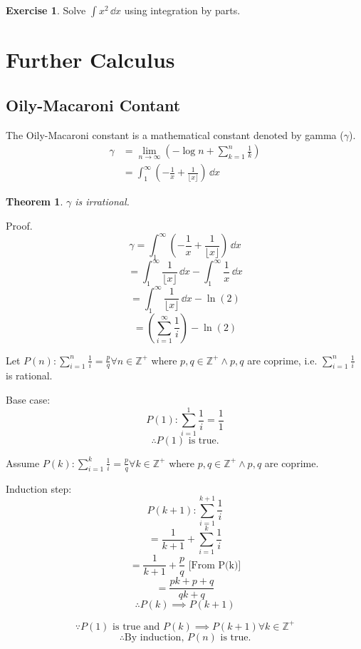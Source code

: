 \documentclass[a4paper]{article}
\theoremstyle{plain}
\newtheorem{theorem}{Theorem}[section]
\theoremstyle{definition}
\newtheorem{exercise}{Exercise}[section]
\theoremstyle{remark}
\newcommand{\sectionSpace}{\vspace{2em}} %
\newcommand{\subsectionSpace}{\vspace{0.5em}}
\begin{document}
    \begin{exercise}
        Solve $\int x^2\,\dd{x}$ using integration by parts.
    \end{exercise}


\sectionSpace
\section{Further Calculus}
    \subsection{Oily-Macaroni Contant}
    The Oily-Macaroni constant is a mathematical constant denoted by gamma ($\gamma$).
    \begin{align}
        \gamma & = \lim_{n \to \infty} \left(-\log n + \sum_{k=1}^{n}{\frac{1}{k}}\right) \\
        & = \int_{1}^{\infty} \left(-\frac{1}{x}+\frac{1}{\lfloor x \rfloor}\right)\,\dd{x}
    \end{align}
    \subsectionSpace
    \begin{theorem}
     $\gamma$ is irrational.
    \end{theorem}
    Proof.
    $$\gamma= \int_{1}^{\infty} \left(-\frac{1}{x}+\frac{1}{\lfloor x \rfloor}\right)\,\dd{x}$$
    $$=\int_{1}^{\infty} \frac{1}{\lfloor x \rfloor}\,\dd{x}-\int_{1}^{\infty} \frac{1}{x}\,\dd{x}$$
    $$=\int_{1}^{\infty} \frac{1}{\lfloor x \rfloor}\,\dd{x}-\ln (2)$$
    $$=\left(\sum_{i=1}^{\infty} \frac{1}{i}\right)-\ln (2)$$
    
    Let $P(n): \sum\limits_{i=1}^{n} \frac{1}{i} =\frac{p}{q}\forall n\in\mathbb{Z}^+$ where $p,q \in\mathbb{Z}^+\wedge p, q$ are coprime, i.e. $\sum\limits_{i=1}^{n} \frac{1}{i}$ is rational.
    
    Base case:
    $$P(1): \sum\limits_{i=1}^{1} \frac{1}{i}=\frac{1}{1}$$
    $$\therefore P(1) \text{ is true.}$$
    
    Assume $P(k): \sum\limits_{i=1}^{k} \frac{1}{i} =\frac{p}{q}\forall k\in\mathbb{Z}^+$ where $p,q \in\mathbb{Z}^+\wedge p, q$ are coprime.
    
    Induction step:
    $$P(k+1):\sum\limits_{i=1}^{k+1} \frac{1}{i}$$
    $$=\frac{1}{k+1}+\sum\limits_{i=1}^{k} \frac{1}{i}$$
    $$=\frac{1}{k+1}+\frac{p}{q}\text{    [From P(k)]}$$
    $$=\frac{pk+p+q}{qk+q}$$
    $$\therefore P(k)\implies P(k+1)$$
    
    $$\because P(1)\text{ is true and }P(k)\implies P(k+1)\forall k\in\mathbb{Z}^+$$
    $$\therefore\text{By induction, }P(n)\text{ is true.}$$
    
\end{document}
